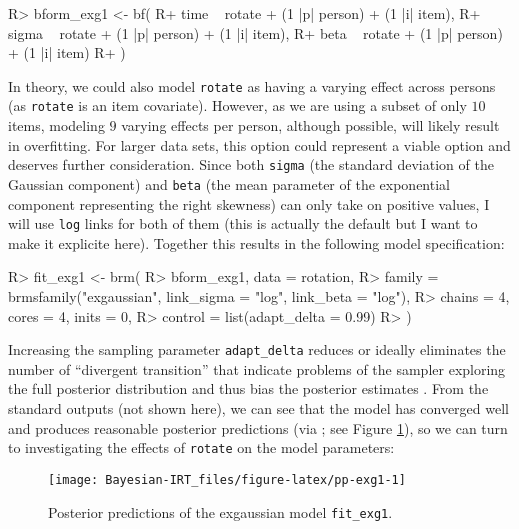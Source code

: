 \documentclass[jss]{jss}
\begin{document}
\begin{CodeChunk}

\begin{CodeInput}
R> bform_exg1 <- bf(
R+   time ~ rotate + (1 |p| person) + (1 |i| item),
R+   sigma ~ rotate + (1 |p| person) + (1 |i| item),
R+   beta ~ rotate + (1 |p| person) + (1 |i| item)
R+ )
\end{CodeInput}
\end{CodeChunk}

In theory, we could also model \texttt{rotate} as having a varying
effect across persons (as \texttt{rotate} is an item covariate).
However, as we are using a subset of only \(10\) items, modeling \(9\)
varying effects per person, although possible, will likely result in
overfitting. For larger data sets, this option could represent a viable
option and deserves further consideration. Since both \texttt{sigma}
(the standard deviation of the Gaussian component) and \texttt{beta}
(the mean parameter of the exponential component representing the right
skewness) can only take on positive values, I will use \texttt{log}
links for both of them (this is actually the default but I want to make
it explicite here). Together this results in the following model
specification:

\begin{CodeChunk}

\begin{CodeInput}
R> fit_exg1 <- brm(
R>   bform_exg1, data = rotation,
R>   family = brmsfamily("exgaussian", link_sigma = "log", link_beta = "log"),
R>   chains = 4, cores = 4, inits = 0,
R>   control = list(adapt_delta = 0.99)
R> )
\end{CodeInput}
\end{CodeChunk}

Increasing the sampling parameter \texttt{adapt\_delta} reduces or
ideally eliminates the number of ``divergent transition'' that indicate
problems of the sampler exploring the full posterior distribution and
thus bias the posterior estimates \citep{carpenter2017, hoffman2014}.
From the standard outputs (not shown here), we can see that the model
has converged well and produces reasonable posterior predictions (via
; see Figure \ref{fig:pp-exg1}), so we can turn
to investigating the effects of \texttt{rotate} on the model parameters:

\begin{CodeChunk}
\begin{figure}

{\centering \texttt{[image: Bayesian-IRT\_files/figure-latex/pp-exg1-1]} 

}

\caption[Posterior predictions of the exgaussian model \texttt{fit\_exg1}]{Posterior predictions of the exgaussian model \texttt{fit\_exg1}.}\label{fig:pp-exg1}
\end{figure}
\end{CodeChunk}
\end{document}
